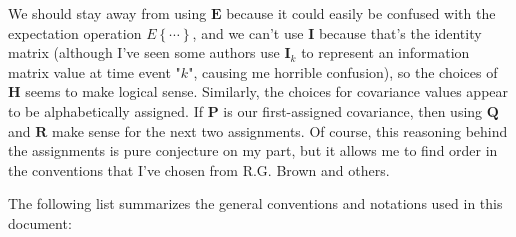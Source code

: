 \documentclass[12pt]{article}
\begin{document}
We should stay away from using $\mathbf{E}$ because it could easily be confused with the
expectation operation $E \left\{ \cdots \right\}$, and we can’t use $\mathbf{I}$ because
that’s the identity matrix (although I’ve seen some authors use $\mathbf{I}_k$ to represent
an information matrix value at time event "$k$", causing me horrible confusion), so the
choices of $\mathbf{H}$ seems to make logical sense. Similarly, the choices for covariance
values appear to be alphabetically assigned. If $\mathbf{P}$ is our first-assigned covariance,
then using $\mathbf{Q}$ and $\mathbf{R}$ make sense for the next two assignments. Of course,
this reasoning behind the assignments is pure conjecture on my part, but it allows me to
find order in the conventions that I’ve chosen from R.G. Brown and others.

The following list summarizes the general conventions and notations used in this document:
\end{document}
